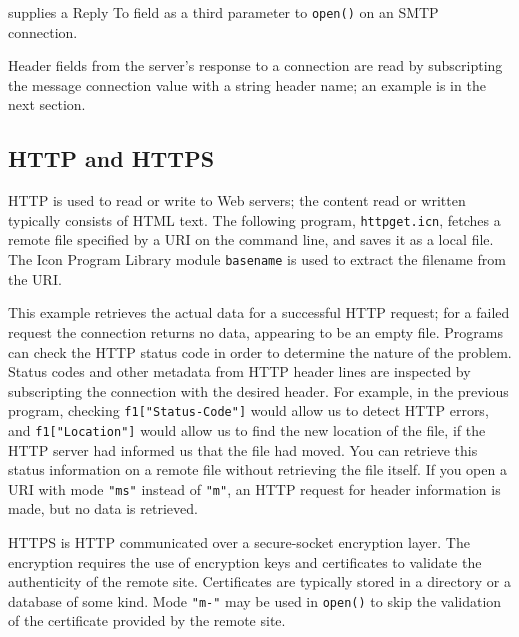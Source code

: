 
\noindent
supplies a Reply To field as a third parameter to \texttt{open()} on an
SMTP connection.

Header fields from the server's response to a
connection are read by subscripting the message connection value
with a string header name; an example is in the next section.

\subsection*{HTTP and HTTPS}

HTTP is used to read or write to Web servers; the content
read or written typically consists of HTML text. The
following program, \texttt{httpget.icn}, fetches a remote file
specified by a URI on the command line, and saves it as a local file.
The Icon Program Library module \texttt{basename} is used to extract
the filename from the URI.



This example retrieves the actual data for a successful HTTP request;
for a failed request the connection returns no data, appearing to be an
empty file. Programs can check the HTTP status code in order to
determine the nature of the problem. Status codes and other metadata
from HTTP header lines are inspected by subscripting the connection
with the desired header. For example, in the previous program, checking
\texttt{f1["Status-Code"]} would allow us
to detect HTTP errors, and
\texttt{f1["Location"]} would allow us to
find the new location of the file, if the HTTP server had informed us
that the file had moved. You can retrieve this status information on a
remote file without retrieving the file itself. If you open a URI with
mode \texttt{"ms"} instead of
\texttt{"m"}, an HTTP request for header
information is made, but no data is retrieved.

HTTPS is HTTP communicated over a secure-socket
encryption layer. The encryption requires the use of encryption keys
and certificates to validate the authenticity of the remote site.
Certificates are typically stored in a directory or a
database of some kind. Mode \texttt{"m-"} may be used in
\texttt{open()} to skip the validation of the certificate provided
by the remote site.

